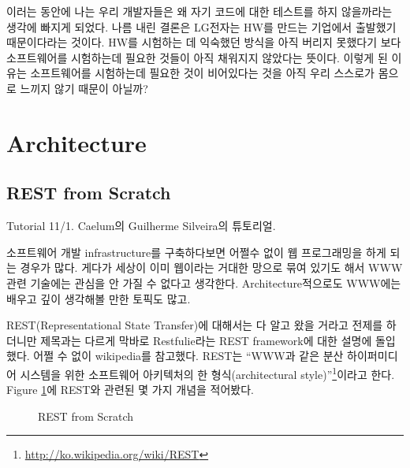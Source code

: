 \documentclass[11pt]{article}
\begin{document}

이러는 동안에 나는
우리 개발자들은 왜 자기 코드에 대한 테스트를 하지 않을까라는 생각에
빠지게 되었다. 나름 내린 결론은 LG전자는 HW를 만드는 기업에서 출발했기
때문이다라는 것이다.
HW를 시험하는 데 익숙했던 방식을 아직 버리지 못했다기 보다 소프트웨어를
시험하는데 필요한 것들이 아직 채워지지 않았다는 뜻이다. 이렇게 된
이유는 소프트웨어를 시험하는데 필요한 것이 비어있다는 것을 아직 우리 스스로가
몸으로 느끼지 않기 때문이 아닐까?
 

\section{Architecture}

\subsection{REST from Scratch}

Tutorial 11/1. Caelum의 Guilherme Silveira의 튜토리얼.

소프트웨어 개발 infrastructure를 구축하다보면 어쩔수 없이 웹 프로그래밍을 
하게 되는 경우가 많다. 게다가 세상이 이미 웹이라는 거대한 망으로 묶여 있기도 
해서 WWW 관련 기술에는 관심을 안 가질 수 없다고 생각한다. Architecture적으로도
WWW에는 배우고 깊이 생각해볼 만한 토픽도 많고.

REST(Representational State Transfer)에 대해서는 다 알고 왔을 거라고 전제를 
하더니만 제목과는 다르게 막바로 Restfulie\cite{restfulie}라는 REST 
framework에 대한 설명에 돌입했다. 어쩔 수 없이 wikipedia를 참고했다. 
REST는 ``WWW과 같은 분산 하이퍼미디어 시스템을 위한 소프트웨어 아키텍처의 한 
형식(architectural style)''\footnote{\url{http://ko.wikipedia.org/wiki/REST}}이라고 한다. Figure \ref{REST}에 REST와 관련된 몇 가지 개념을 적어봤다.

\begin{figure}[t]
    \begin{Frame}
        \begin{center}
        \end{center}
    \end{Frame}
    \caption{REST from Scratch}
    \label{REST}
\end{figure}

% 
\end{document}
